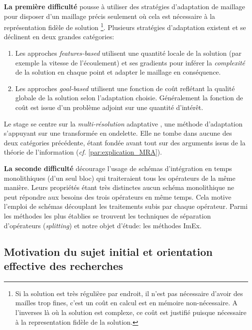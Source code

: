     \textbf{La première difficulté} pousse à utiliser des stratégies d'adaptation de maillage pour disposer d'un maillage précis seulement où cela est nécessaire à la représentation fidèle de solution
    \footnote{Si la solution est très régulière par endroit, il n'est pas nécessaire d'avoir des mailles trop fines, c'est un coût en calcul est en mémoire non-nécessaire.
    A l’inverses là où la solution est complexe, ce coût est justifié puisque nécessaire à la representation fidèle de la solution.}.
    Plusieurs stratégies d'adaptation existent et se déclinent en deux grandes catégories\cite{Vivarelli2025Fluids}:
    \begin{enumerate}
        \item Les approches \textit{features-based} utilisent une quantité locale de la solution (par exemple la vitesse de l'écoulement) 
        et ses gradients pour inférer la \textit{complexité} de la solution en chaque point et adapter le maillage en conséquence.
        \item Les approches \textit{goal-based} utilisent une fonction de coût reflétant la qualité globale de la solution selon l'adaptation choisie.
        Généralement la fonction de coût est issue d'un problème adjoint sur une quantité d'intérêt.
    \end{enumerate}
    Le stage se centre sur la \textit{multi-résolution} adaptative \cite{harten1994}, une méthode d'adaptation s'appuyant sur une transformée en ondelette.
    Elle ne tombe dans aucune des deux catégories précédente, étant fondée avant tout sur des arguments issus de la théorie de l'information 
    (\textit{cf.} \ref{par:explication_MRA}).\par

    \textbf{La seconde difficulté} décourage l'usage de schémas d'intégration en temps monolithiques (d'un seul bloc) qui traiteraient tous les opérateurs de la même manière.
    Leurs propriétés étant très distinctes aucun schéma monolithique ne peut répondre aux besoins des trois opérateurs en même temps.
    Cela motive l'emploi de schémas découplant les traitements subis par chaque opérateur. Parmi les méthodes les plus établies se trouvent 
    les techniques de séparation d'opérateurs (\textit{splitting}) et notre objet d'étude: les méthodes ImEx.

\subsection{Motivation du sujet initial et orientation effective des recherches}
